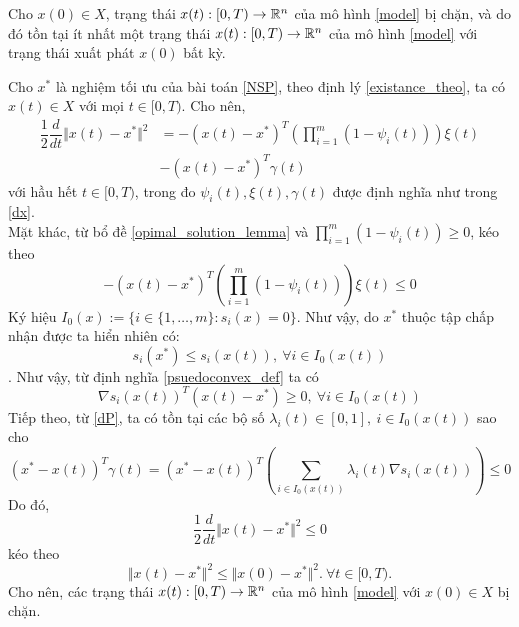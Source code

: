 \begin{dl}
    \label{bounded_theo}
    Cho $x(0) \in X$, trạng thái $x(t): [0, T) \to \mathbb{R}^n$ của mô hình \eqref{model} bị chặn, và do đó tồn tại ít nhất một trạng thái $x(t): [0, T) \to \mathbb{R}^n$ của mô hình \eqref{model} với trạng thái xuất phát $x(0)$ bất kỳ.
\end{dl}
\begin{cm}
    Cho $x^*$ là nghiệm tối ưu của bài toán \eqref{NSP}, theo định lý \ref{existance_theo}, ta có $x(t) \in X $ với mọi $t \in [0, T)$. Cho nên,
    \begin{align}
        \label{dnorm}
        \dfrac{1}{2}\dfrac{d}{dt} \Vert x(t) - x^* \Vert^2 &= - (x(t) - x^*)^T \left( \prod_{i=1}^{m}(1 - \psi_i(t)) \right) \xi(t)\\
     &- (x(t) - x^*)^T \gamma(t) \nonumber
    \end{align}
    với hầu hết $t \in [0, T)$, trong đo $\psi_i(t), \xi(t), \gamma(t)$ được định nghĩa như trong \eqref{dx}. \\
    \indent Mặt khác, từ bổ đề \ref{opimal_solution_lemma} và $\prod_{i=1}^{m}(1 - \psi_i(t)) \geq 0$, kéo theo
    \begin{equation}
        - (x(t) - x^*)^T \left( \prod_{i=1}^{m}(1 - \psi_i(t)) \right) \xi(t) \leq 0
    \end{equation}
    Ký hiệu $I_0(x):= \{i \in \{1, \dots, m \}: s_i(x) = 0 \}$. Như vậy, do $x^*$ thuộc tập chấp nhận được ta hiển nhiên có:
    $$ s_i(x^*) \leq s_i(x(t)),\ \forall i \in I_0(x(t)) $$.
    Như vậy, từ định nghĩa \ref{psuedoconvex_def} ta có
    $$ \nabla s_i(x(t))^T (x(t) - x^*) \geq 0,\ \forall i \in I_0(x(t))$$
    Tiếp theo, từ \eqref{dP}, ta có tồn tại các bộ số $\lambda_i(t) \in [0,1],\ i \in I_0(x(t)) $ sao cho
    \begin{equation}
        (x^* - x(t))^T\gamma(t) = (x^* - x(t))^T\left( \sum_{i \in I_0(x(t))} \lambda_i(t)\nabla s_i(x(t)) \right) \leq 0
    \end{equation}
    Do đó, 
    \begin{equation}
        \label{lessthan0}
        \dfrac{1}{2}\dfrac{d}{dt} \Vert x(t) - x^* \Vert^2 \leq 0
    \end{equation}
    kéo theo 
    \begin{equation}
        \Vert x(t) - x^* \Vert^2 \leq \Vert x(0) - x^* \Vert^2.\ \forall t \in [0, T).
    \end{equation}
    Cho nên, các trạng thái $x(t): [0, T) \to \mathbb{R}^n$ của mô hình \eqref{model} với $x(0) \in X$ bị chặn.
\end{cm}  



